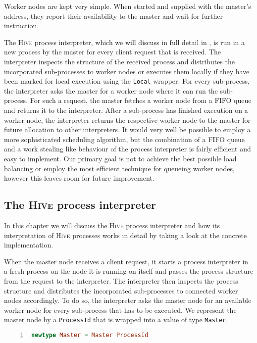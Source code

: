 Worker nodes are kept very simple. When started and supplied with the master's address, they report their availability to the master and wait for further instruction.

The \textsc{Hive} process interpreter, which we will discuss in full detail in , is run in a new process by the master for every client request that is received. The interpreter inspects the structure of the received process and distributes the incorporated sub-processes to worker nodes or executes them locally if they have been marked for local execution using the \texttt{Local} wrapper. For every sub-process, the interpreter asks the master for a worker node where it can run the sub-process. For such a request, the master fetches a worker node from a FIFO queue and returns it to the interpreter. After a sub-process has finished execution on a worker node, the interpreter returns the respective worker node to the master for future allocation to other interpreters. It would very well be possible to employ a more sophisticated scheduling algorithm, but the combination of a FIFO queue and a work stealing like \cite{} behaviour of the process interpreter is fairly efficient and easy to implement. Our primary goal is not to achieve the best possible load balancing or employ the most efficient technique for queueing worker nodes, however this leaves room for future improvement.

\subsection{The \textsc{Hive} process interpreter}
\label{chp:interpreter}
In this chapter we will discuss the \textsc{Hive} process interpreter and how its interpretation of \textsc{Hive} processes works in detail by taking a look at the concrete implementation.

When the master node receives a client request, it starts a process interpreter in a fresh process on the node it is running on itself and passes the process structure from the request to the interpreter. The interpreter then inspects the process structure and distributes the incorporated sub-processes to connected worker nodes accordingly. To do so, the interpreter asks the master node for an available worker node for every sub-process that has to be executed. We represent the master node by a \texttt{ProcessId} that is wrapped into a value of type \texttt{Master}.
\begin{lstlisting}[language=Haskell,caption=Data type for the address of a master node.,numbers=left,frame=bt]
newtype Master = Master ProcessId
\end{lstlisting}


